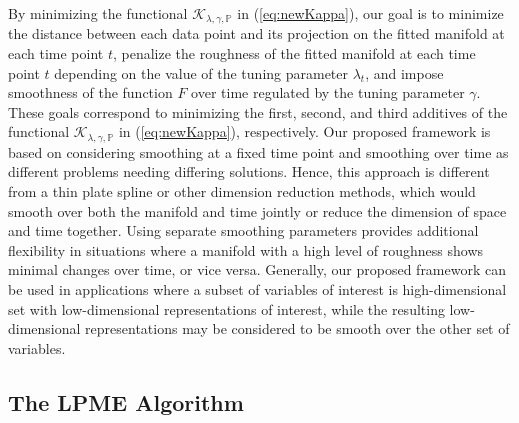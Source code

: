 \documentclass[11pt,reqno]{article}
\theoremstyle{definition}
\begin{document}
By minimizing the functional $\mathcal{K}_{\lambda, \gamma, \mathbb{P}}$ in (\ref{eq:newKappa}), our goal is to minimize the distance between each data point and its projection on the fitted manifold at each time point $t$, penalize the roughness of the fitted manifold at each time point $t$ depending on the value of the tuning parameter $\lambda_t$, and impose smoothness of the function $F$ over time regulated by the tuning parameter $\gamma$. These goals correspond to minimizing the first, second, and third additives of the functional $\mathcal{K}_{\lambda, \gamma, \mathbb{P}}$ in (\ref{eq:newKappa}), respectively. Our proposed framework is based on considering smoothing at a fixed time point and smoothing over time as different problems needing differing solutions. Hence, this approach is different from a thin plate spline or other dimension reduction methods, which would smooth over both the manifold and time jointly or reduce the dimension of space and time together. Using separate smoothing parameters provides additional flexibility in situations where a manifold with a high level of roughness shows minimal changes over time, or vice versa. Generally, our proposed framework can be used in applications where a subset of variables of interest is high-dimensional set with low-dimensional representations of interest, while the resulting low-dimensional representations may be considered to be smooth over the other set of variables.







\subsection{The LPME Algorithm}
\end{document}
